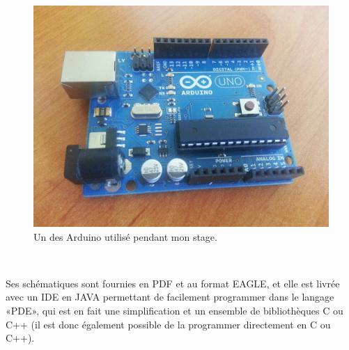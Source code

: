 \documentclass{article}
\begin{document}
\begin{figure}[h!]
    \centering\includegraphics[width=\linewidth/2]{img/arduino.jpg}
    \caption{Un des Arduino utilisé pendant mon stage.}
\end{figure}

~

Ses schématiques sont fournies en PDF et au format EAGLE, et elle est livrée avec un IDE en JAVA permettant de facilement programmer dans le langage «PDE», qui est en fait une simplification et un ensemble de bibliothèques C ou C++ (il est donc également possible de la programmer directement en C ou C++).
\end{document}

